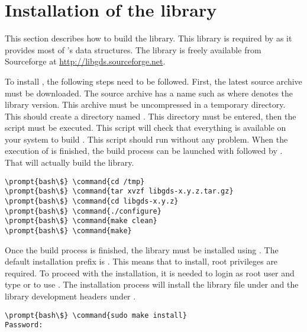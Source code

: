 \section{Installation of the  library}
\label{sec:inst-libgds}

This section describes how to build the 
library. This library is required by  as it
provides most of 's data structures. The
 library is freely available from Sourceforge at
\url{http://libgds.sourceforge.net}. 

To install , the following steps need to be
followed. First, the latest source archive must be downloaded. The
source archive has a name such as  where
 denotes the library version. This archive must be
uncompressed in a temporary directory. This should create a directory
named . This directory must be entered, then
the  script must be executed. This script will
check that everything is available on your system to build
. This script should run without any problem. When
the execution of  is finished, the build process
can be launched with  followed by
. That will actually build the library.

\begin{Verbatim}[commandchars=\\\{\}]
\prompt{bash\$} \command{cd /tmp}
\prompt{bash\$} \command{tar xvzf libgds-x.y.z.tar.gz}
\prompt{bash\$} \command{cd libgds-x.y.z}
\prompt{bash\$} \command{./configure}
\prompt{bash\$} \command{make clean}
\prompt{bash\$} \command{make}
\end{Verbatim}

Once the build process is finished, the library must be
installed using . The default installation
prefix is . This means that to install, root
privileges are required. To proceed with the installation, it is
needed to login as root user and type  or to use
. The installation process will install the
library file under  and the library development
headers under .

\begin{Verbatim}[commandchars=\\\{\}]
\prompt{bash\$} \command{sudo make install}
Password:
\end{Verbatim}

